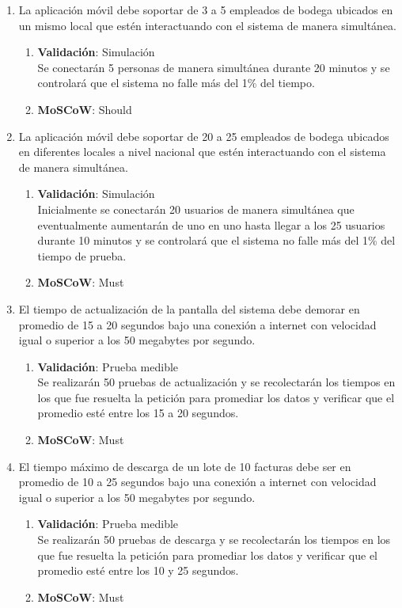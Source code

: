 \documentclass{scrreprt}
\begin{document}
\begin{enumerate}
    \item La aplicación móvil debe soportar de 3 a 5 empleados de bodega ubicados en un mismo local que estén interactuando con el sistema de manera simultánea. 
    \begin{enumerate}
        \item \textbf{Validación}: Simulación\\
        Se conectarán 5 personas de manera simultánea durante 20 minutos y se controlará que el sistema no falle más del 1\% del tiempo.
        \item \textbf{MoSCoW}: Should
    \end{enumerate}
    
    \item La aplicación móvil debe soportar de 20 a 25 empleados de bodega ubicados en diferentes locales a nivel nacional que estén interactuando con el sistema de manera simultánea. 
    \begin{enumerate}
        \item \textbf{Validación}: Simulación\\
        Inicialmente se conectarán 20 usuarios de manera simultánea que eventualmente aumentarán de uno en uno hasta llegar a los 25 usuarios durante 10 minutos y se controlará que el sistema no falle más del 1\% del tiempo de prueba. 
        \item \textbf{MoSCoW}: Must
    \end{enumerate}
    
    \item El tiempo de actualización de la pantalla del sistema debe demorar en promedio de 15 a 20 segundos bajo una conexión a internet con velocidad igual o superior a los 50 megabytes por segundo.
    \begin{enumerate}
        \item \textbf{Validación}: Prueba medible\\
        Se realizarán 50 pruebas de actualización y se recolectarán los tiempos en los que fue resuelta la petición para promediar los datos y verificar que el promedio esté entre los 15 a 20 segundos.
        \item \textbf{MoSCoW}: Must
    \end{enumerate}
    
    \item El tiempo máximo de descarga de un lote de 10 facturas debe ser en promedio de 10 a 25 segundos bajo una conexión a internet con velocidad igual o superior a los 50 megabytes por segundo. 
    \begin{enumerate}
        \item \textbf{Validación}: Prueba medible\\
        Se realizarán 50 pruebas de descarga y se recolectarán los tiempos en los que fue resuelta la petición para promediar los datos y verificar que el promedio esté entre los 10 y 25 segundos.
        \item \textbf{MoSCoW}: Must
    \end{enumerate}
    
\end{enumerate}
\end{document}
